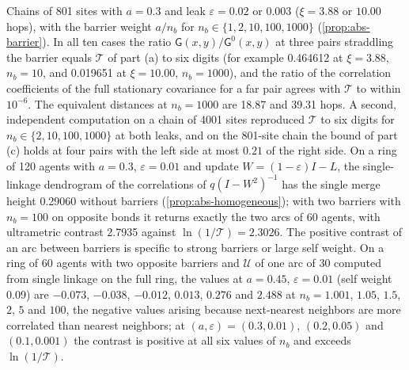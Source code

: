 \begin{numcheck}\label{chk:abs-barrier}
Chains of 801 sites with $a=0.3$ and leak $\varepsilon=0.02$ or $0.003$ ($\xi=3.88$ or $10.00$ hops), with the barrier weight $a/n_b$ for $n_b\in\{1,2,10,100,1000\}$ (\cref{prop:abs-barrier}). In all ten cases the ratio $\mathsf G(x,y)/\mathsf G^0(x,y)$ at three pairs straddling the barrier equals $\mathcal T$ of part (a) to six digits (for example 0.464612 at $\xi=3.88$, $n_b=10$, and 0.019651 at $\xi=10.00$, $n_b=1000$), and the ratio of the correlation coefficients of the full stationary covariance for a far pair agrees with $\mathcal T$ to within $10^{-6}$. The equivalent distances at $n_b=1000$ are 18.87 and 39.31 hops. A second, independent computation on a chain of 4001 sites reproduced $\mathcal T$ to six digits for $n_b\in\{2,10,100,1000\}$ at both leaks, and on the 801-site chain the bound of part (c) holds at four pairs with the left side at most $0.21$ of the right side. On a ring of 120 agents with $a=0.3$, $\varepsilon=0.01$ and update $W=(1-\varepsilon)I-L$, the single-linkage dendrogram of the correlations of $q(I-W^2)^{-1}$ has the single merge height 0.29060 without barriers (\cref{prop:abs-homogeneous}); with two barriers with $n_b=100$ on opposite bonds it returns exactly the two arcs of 60 agents, with ultrametric contrast 2.7935 against $\ln(1/\mathcal T)=2.3026$. The positive contrast of an arc between barriers is specific to strong barriers or large self weight. On a ring of 60 agents with two opposite barriers and $\mathcal U$ of one arc of 30 computed from single linkage on the full ring, the values at $a=0.45$, $\varepsilon=0.01$ (self weight 0.09) are $-0.073$, $-0.038$, $-0.012$, $0.013$, $0.276$ and $2.488$ at $n_b=1.001$, $1.05$, $1.5$, $2$, $5$ and $100$, the negative values arising because next-nearest neighbors are more correlated than nearest neighbors; at $(a,\varepsilon)=(0.3,0.01)$, $(0.2,0.05)$ and $(0.1,0.001)$ the contrast is positive at all six values of $n_b$ and exceeds $\ln(1/\mathcal T)$.
\end{numcheck}

